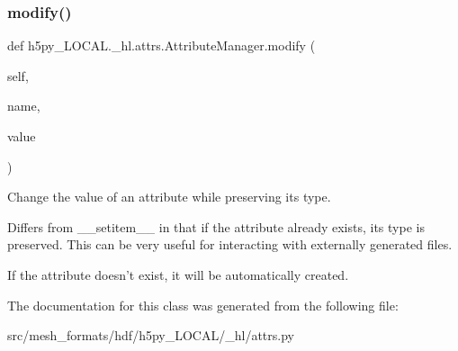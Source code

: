\subsubsection{\texorpdfstring{modify()}{modify()}}
{\footnotesize\ttfamily def h5py\+\_\+\+L\+O\+C\+A\+L.\+\_\+hl.\+attrs.\+Attribute\+Manager.\+modify (\begin{DoxyParamCaption}\item[{}]{self,  }\item[{}]{name,  }\item[{}]{value }\end{DoxyParamCaption})}

\begin{DoxyVerb}Change the value of an attribute while preserving its type.

Differs from __setitem__ in that if the attribute already exists, its
type is preserved.  This can be very useful for interacting with
externally generated files.

If the attribute doesn't exist, it will be automatically created.
\end{DoxyVerb}
 

The documentation for this class was generated from the following file\+:\begin{DoxyCompactItemize}
\item 
src/mesh\+\_\+formats/hdf/h5py\+\_\+\+L\+O\+C\+A\+L/\+\_\+hl/attrs.\+py\end{DoxyCompactItemize}
